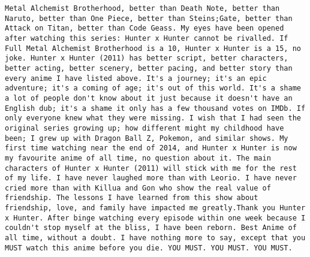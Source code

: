 \documentclass[
]{article}
\begin{document}
\begin{verbatim}
Metal Alchemist Brotherhood, better than Death Note, better than Naruto, better than One Piece, better than Steins;Gate, better than Attack on Titan, better than Code Geass. My eyes have been opened after watching this series: Hunter x Hunter cannot be rivalled. If Full Metal Alchemist Brotherhood is a 10, Hunter x Hunter is a 15, no joke. Hunter x Hunter (2011) has better script, better characters, better acting, better scenery, better pacing, and better story than every anime I have listed above. It's a journey; it's an epic adventure; it's a coming of age; it's out of this world. It's a shame a lot of people don't know about it just because it doesn't have an English dub; it's a shame it only has a few thousand votes on IMDb. If only everyone knew what they were missing. I wish that I had seen the original series growing up; how different might my childhood have been; I grew up with Dragon Ball Z, Pokemon, and similar shows. My first time watching near the end of 2014, and Hunter x Hunter is now my favourite anime of all time, no question about it. The main characters of Hunter x Hunter (2011) will stick with me for the rest of my life. I have never laughed more than with Leorio. I have never cried more than with Killua and Gon who show the real value of friendship. The lessons I have learned from this show about friendship, love, and family have impacted me greatly.Thank you Hunter x Hunter. After binge watching every episode within one week because I couldn't stop myself at the bliss, I have been reborn. Best Anime of all time, without a doubt. I have nothing more to say, except that you MUST watch this anime before you die. YOU MUST. YOU MUST. YOU MUST.

\end{verbatim}
\end{document}
